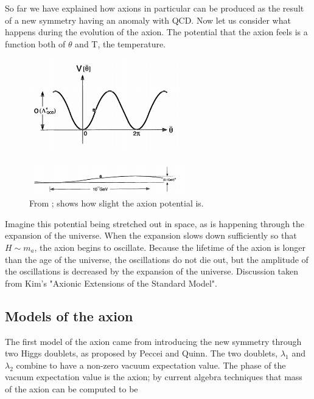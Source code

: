 \documentclass[12pt,twosides]{book}
\begin{document}
So far we have explained how axions in particular can be produced as the result of a new symmetry having an anomaly with QCD. Now let us consider what happens during the evolution of the axion. The potential that the axion feels is a function both of $\theta$ and T, the temperature. 

\begin{figure}
\includegraphics[width=0.6\textwidth]{vthetavstheta}
\end{figure}


\begin{figure}
\includegraphics[width=0.6\textwidth]{axionpotential}
\caption{From \cite{kim95}; shows how slight the axion potential is.}
\end{figure}

Imagine this potential being stretched out in space, as is happening through the expansion of the universe. When the expansion slows down sufficiently so that $H \sim m_a$, the axion begins to oscillate. Because the lifetime of the axion is longer than the age of the universe, the oscillations do not die out, but the amplitude of the oscillations is decreased by the expansion of the universe. Discussion taken from Kim's "Axionic Extensions of the Standard Model".


\subsection{Models of the axion}

The first model of the axion came from introducing the new symmetry through two Higgs doublets, as proposed by Peccei and Quinn. The two doublets, $\lambda_1$ and $\lambda_2$ combine to have a non-zero vacuum expectation value. The phase of the vacuum expectation value is the axion; by current algebra techniques that mass of the axion can be computed to be 
\end{document}
